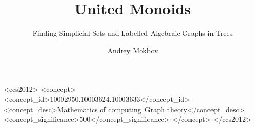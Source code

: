 \documentclass[english,submission]{programming}
\begin{document}

\title{United Monoids}
\subtitle{Finding Simplicial Sets and Labelled Algebraic Graphs in Trees}
\author[~]{Andrey Mokhov}


\begin{CCSXML}
<ccs2012>
<concept>
<concept_id>10002950.10003624.10003633</concept_id>
<concept_desc>Mathematics of computing~Graph theory</concept_desc>
<concept_significance>500</concept_significance>
</concept>
</ccs2012>
\end{CCSXML}


\maketitle
\end{document}
